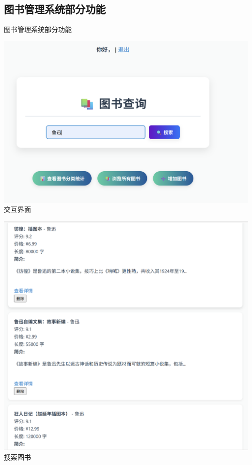 \documentclass{ctexbeamer}
\begin{document}
\subsection{图书管理系统部分功能}
\begin{frame}{图书管理系统部分功能}
  \centering
  \begin{minipage}{0.30\textwidth}
    \centering
    \includegraphics[width=\textwidth]{fig/book1.png} \\
    交互界面
  \end{minipage}
  \begin{minipage}{0.30\textwidth}
    \centering
    \includegraphics[width=\textwidth]{fig/book2.png} \\
    搜索图书
  \end{minipage}


\end{frame}
\end{document}
